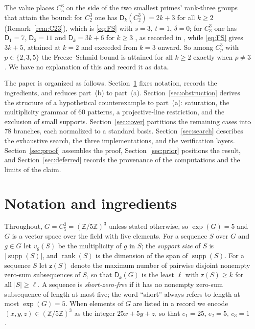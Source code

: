 \documentclass[11pt]{article}
\theoremstyle{definition}
\theoremstyle{remark}
\newcommand{\Dk}{\mathsf{D}}
\newcommand{\C}{C_5^{3}}
\newcommand{\supp}{\operatorname{supp}}
\newcommand{\rank}{\operatorname{rank}}
\newcommand{\zz}{\mathsf{z}}
\begin{document}
The value places $\C$ on the side of the two smallest primes' rank-three groups that attain the bound: for $C_2^3$ one has $\Dk_k(C_2^3)=2k+3$ for all $k\ge2$ (Remark~\ref{rem:C23}), which is \eqref{eq:FS} with $s=3$, $t=1$, $\delta=0$; for $C_3^3$ one has $\Dk_1=7$, $\Dk_2=11$ and $\Dk_k=3k+6$ for $k\ge3$ \cite{BhowmikSchlagePuchta2007}, as recorded in \cite[Remark~5.3]{FreezeSchmid2010}, while \eqref{eq:FS} gives $3k+5$, attained at $k=2$ and exceeded from $k=3$ onward. So among $C_p^3$ with $p\in\{2,3,5\}$ the Freeze--Schmid bound is attained for all $k\ge2$ exactly when $p\ne3$. We have no explanation of this and record it as data.

The paper is organized as follows. Section~\ref{sec:ingredients} fixes notation, records the ingredients, and reduces part~(b) to part~(a). Section~\ref{sec:obstruction} derives the structure of a hypothetical counterexample to part~(a): saturation, the multiplicity grammar of $60$ patterns, a projective-line restriction, and the exclusion of small supports. Section~\ref{sec:cover} partitions the remaining cases into $78$ branches, each normalized to a standard basis. Section~\ref{sec:search} describes the exhaustive search, the three implementations, and the verification layers. Section~\ref{sec:proof} assembles the proof, Section~\ref{sec:prior} positions the result, and Section~\ref{sec:deferred} records the provenance of the computations and the limits of the claim.

\section{Notation and ingredients}\label{sec:ingredients}

Throughout, $G=\C=(\mathbb{Z}/5\mathbb{Z})^3$ unless stated otherwise, so $\exp(G)=5$ and $G$ is a vector space over the field with five elements. For a sequence $S$ over $G$ and $g\in G$ let $v_g(S)$ be the multiplicity of $g$ in $S$; the \emph{support size} of $S$ is $|\supp(S)|$, and $\rank(S)$ is the dimension of the span of $\supp(S)$. For a sequence $S$ let $\zz(S)$ denote the maximum number of pairwise disjoint nonempty zero-sum subsequences of $S$, so that $\Dk_k(G)$ is the least $\ell$ with $\zz(S)\ge k$ for all $|S|\ge\ell$. A sequence is \emph{short-zero-free} if it has no nonempty zero-sum subsequence of length at most five; the word ``short'' always refers to length at most $\exp(G)=5$. When elements of $G$ are listed in a record we encode $(x,y,z)\in(\mathbb{Z}/5\mathbb{Z})^3$ as the integer $25x+5y+z$, so that $e_1=25$, $e_2=5$, $e_3=1$.
\end{document}
